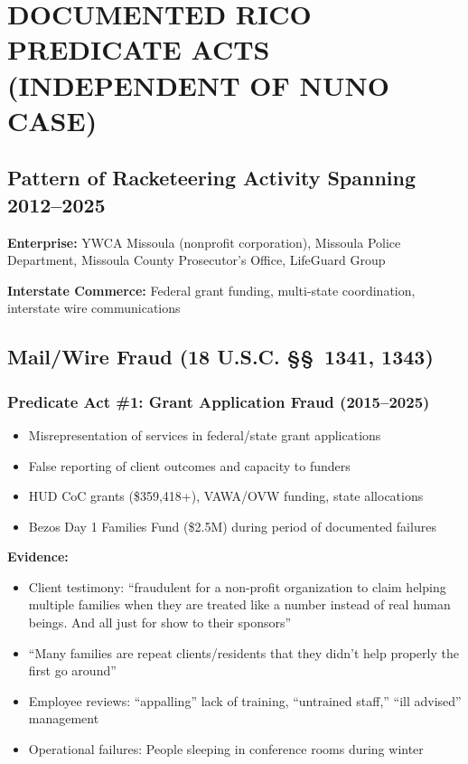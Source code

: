 \documentclass[11pt,letterpaper]{article}
\begin{document}
\newpage

\section{DOCUMENTED RICO PREDICATE ACTS (INDEPENDENT OF NUNO CASE)}

\subsection{Pattern of Racketeering Activity Spanning 2012--2025}

\textbf{Enterprise:} YWCA Missoula (nonprofit corporation), Missoula Police Department, Missoula County Prosecutor's Office, LifeGuard Group

\textbf{Interstate Commerce:} Federal grant funding, multi-state coordination, interstate wire communications

\subsection{Mail/Wire Fraud (18 U.S.C. \S\S~1341, 1343)}

\subsubsection{Predicate Act \#1: Grant Application Fraud (2015--2025)}
\begin{itemize}[leftmargin=*]
\item Misrepresentation of services in federal/state grant applications
\item False reporting of client outcomes and capacity to funders
\item HUD CoC grants (\$359,418+), VAWA/OVW funding, state allocations
\item Bezos Day 1 Families Fund (\$2.5M) during period of documented failures
\end{itemize}

\textbf{Evidence:}
\begin{itemize}[leftmargin=*]
\item Client testimony: ``fraudulent for a non-profit organization to claim helping multiple families when they are treated like a number instead of real human beings. And all just for show to their sponsors''
\item ``Many families are repeat clients/residents that they didn't help properly the first go around''
\item Employee reviews: ``appalling'' lack of training, ``untrained staff,'' ``ill advised'' management
\item Operational failures: People sleeping in conference rooms during winter
\end{itemize}
\end{document}
